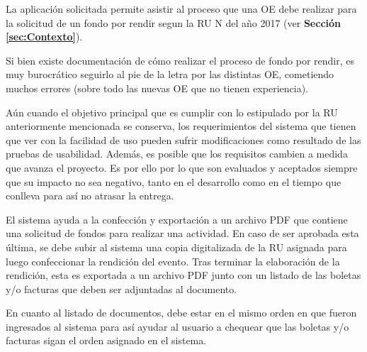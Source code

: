 La aplicación solicitada permite asistir al proceso que una OE debe realizar para la solicitud de un fondo por rendir segun la RU N del año 2017 (ver \textbf{Sección \ref{sec:Contexto}}).

Si bien existe documentación de cómo realizar el proceso de fondo por rendir, es muy burocrático seguirlo al pie de la letra por las distintas OE, cometiendo muchos errores (sobre todo las nuevas OE que no tienen experiencia). 

Aún cuando el objetivo principal que es cumplir con lo estipulado por la RU anteriormente mencionada se conserva, los requerimientos del sistema que tienen que ver con la facilidad de uso pueden sufrir modificaciones como resultado de las pruebas de usabilidad. Además, es posible que los requisitos cambien a medida que avanza el proyecto. Es por ello por lo que son evaluados y aceptados siempre que su impacto no sea negativo, tanto en el desarrollo como en el tiempo que conlleva para así no atrasar la entrega.

El sistema ayuda a la confección y exportación a un archivo PDF que contiene una solicitud de fondos para realizar una actividad. En caso de ser aprobada esta última, se debe subir al sistema una copia digitalizada de la RU asignada para luego confeccionar la rendición del evento. Tras terminar la elaboración de la rendición, esta es exportada a un archivo PDF junto con un listado de las boletas y/o facturas que deben ser adjuntadas al documento. 

En cuanto al listado de documentos, debe estar en el mismo orden en que fueron ingresados al sistema para así ayudar al usuario a chequear que las boletas y/o facturas sigan el orden asignado en el sistema.

